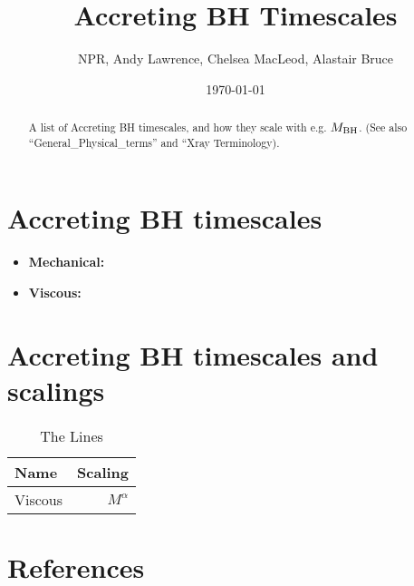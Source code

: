 \documentclass[11pt]{article}
\begin{document}
\title{Accreting BH Timescales}
\author{NPR, Andy Lawrence, Chelsea MacLeod, Alastair Bruce}
\date{\today}
\maketitle


\begin{abstract}
A list of Accreting BH timescales, and how they scale 
with e.g. $M_{\rm BH}$. 
(See also ``General\_Physical\_terms'' and ``Xray Terminology).
\end{abstract}


\section{Accreting BH timescales}

\begin{itemize}
\item{  {\bf Mechanical:} }
\item{  {\bf Viscous:} }
\end{itemize}

\citet{Croom04}
\noindent

\section{Accreting BH timescales and scalings}


\begin{table}
  \caption{The Lines}
  \label{tab:the_lines}
  \begin{center}
    \begin{tabular}{lr} 
      \hline
      \hline
      Name & Scaling \\ 
      \hline
      Viscous & $M^{\alpha}$ \\
     \hline
      \hline
   \end{tabular}
  \end{center}
\end{table}



\section{References}




\end{document}
